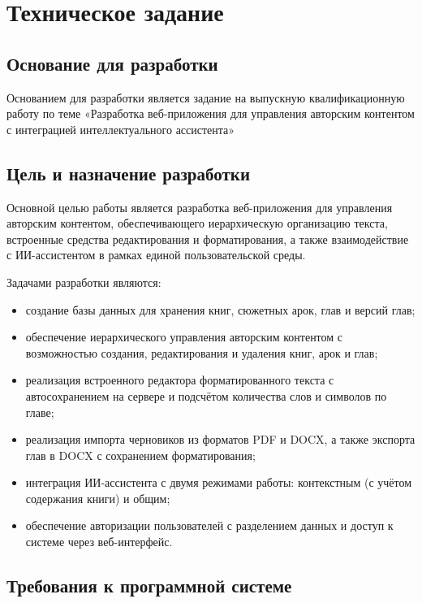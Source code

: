 \section{Техническое задание}
\subsection{Основание для разработки}

Основанием для разработки является задание на выпускную квалификационную работу по теме «Разработка веб-приложения для управления авторским контентом с интеграцией интеллектуального ассистента»

\subsection{Цель и назначение разработки}

Основной целью работы является разработка веб-приложения для управления авторским контентом, обеспечивающего иерархическую организацию текста, встроенные средства редактирования и форматирования, а также взаимодействие с ИИ-ассистентом в рамках единой пользовательской среды.

Задачами разработки являются:

\begin{itemize}
    \item создание базы данных для хранения книг, сюжетных арок, глав и версий глав;
    \item обеспечение иерархического управления авторским контентом с возможностью создания, редактирования и удаления книг, арок и глав;
    \item реализация встроенного редактора форматированного текста с автосохранением на сервере и подсчётом количества слов и символов по главе;
    \item реализация импорта черновиков из форматов PDF и DOCX, а также экспорта глав в DOCX с сохранением форматирования;
    \item интеграция ИИ-ассистента с двумя режимами работы: контекстным (с учётом содержания книги) и общим;
    \item обеспечение авторизации пользователей с разделением данных и доступ к системе через веб-интерфейс.
\end{itemize}

\subsection{Требования к программной системе}

